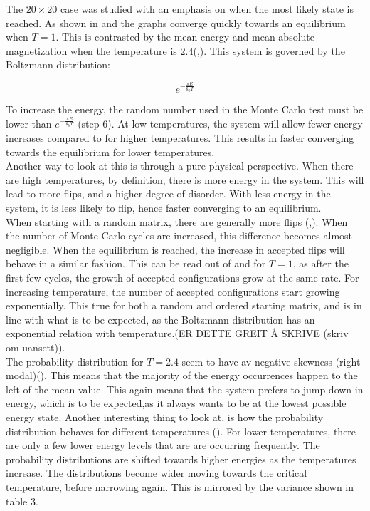 \documentclass[10pt,a4paper]{article}
\begin{document}
\noindent The $20 \times 20$ case was studied with an emphasis on when the most likely state is reached. As shown in  and  the graphs converge quickly towards an equilibrium when $T=1$. This is contrasted by the mean energy and mean absolute magnetization when the temperature is $2.4$(,). This system is governed by the Boltzmann distribution:

$$ e^{-\frac{\vartriangle E}{k_bT}}$$

\noindent To increase the energy, the random number used in the Monte Carlo test must be lower than $e^{-\frac{\vartriangle E}{k_bT}}$  (step 6). At low temperatures, the system will allow fewer energy increases compared to for higher temperatures. This results in faster converging towards the equilibrium for lower temperatures.\\

\noindent Another way to look at this is through a pure physical perspective. When there are high temperatures, by definition, there is more energy in the system. This will lead to more flips, and a higher degree of disorder. With less energy in the system, it is less likely to flip, hence faster converging to an equilibrium.\\

\noindent When starting with a random matrix, there are generally more flips (,). When the number of Monte Carlo cycles are increased, this difference becomes almost negligible. When the equilibrium is reached, the increase in accepted flips will behave in a similar fashion. This can be read out of  and  for $T=1$, as after the first few cycles, the growth of accepted configurations grow at the same rate. For increasing temperature, the number of accepted configurations start growing exponentially. This true for both a random and ordered starting matrix, and is in line with what is to be expected, as the Boltzmann distribution has an exponential relation with temperature.(ER DETTE GREIT Å SKRIVE (skriv om uansett)).\\


\noindent The probability distribution for $T=2.4$ seem to have av negative skewness (right-modal)(). This means that the majority of the energy occurrences happen to the left of the mean value. This again means that the system prefers to jump down in energy, which is to be expected,as it always wants to be at the lowest possible energy state. Another interesting thing to look at, is how the probability distribution behaves for different temperatures (). For lower temperatures, there are only a few lower energy levels that are are occurring frequently. The probability distributions are shifted towards higher energies as the temperatures increase. The distributions become wider moving towards the critical temperature, before narrowing again. This is mirrored by the variance shown in table 3. 
\end{document}
